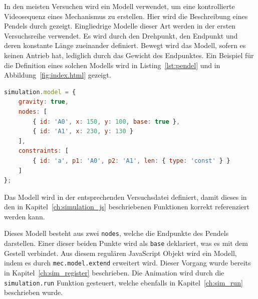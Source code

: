 In den meisten Versuchen wird ein  Modell verwendet, um eine kontrollierte Videosequenz eines Mechanismus zu erstellen.
Hier wird die Beschreibung eines Pendels durch  gezeigt.
Eingliedrige Modelle dieser Art werden in der ersten Versuchsreihe verwendet.
Es wird durch den Drehpunkt, den Endpunkt und deren konstante Länge zueinander definiert.
Bewegt wird das Modell, sofern es keinen Antrieb hat, lediglich durch das Gewicht des Endpunktes.
Ein Beispiel für die Definition eines solchen Modells wird in Listing~\ref{lst:pendel} und in Abbildung~\ref{fig:index.html} gezeigt.

\begin{lstlisting}[language=JavaScript, caption={Definition eines Pendels in \name{mec2} inklusive Animation.}, label={lst:pendel}]
simulation.model = {
    gravity: true,
    nodes: [
        { id: 'A0', x: 150, y: 100, base: true },
        { id: 'A1', x: 230, y: 130 }
    ],
    constraints: [
        { id: 'a', p1: 'A0', p2: 'A1', len: { type: 'const' } }
    ]
};
\end{lstlisting}

Das  Modell wird in der entsprechenden Versuchsdatei definiert, damit dieses in den in Kapitel~\ref{ch:simulation_js} beschriebenen Funktionen korrekt referenziert werden kann.

Dieses Modell besteht aus zwei \lstinline{nodes}, welche die Endpunkte des Pendels darstellen.
Einer dieser beiden Punkte wird als \lstinline{base} deklariert, was es mit dem Gestell verbindet.
Aus diesem regulären JavaScript Objekt wird ein  Modell, indem es durch \lstinline{mec.model.extend} erweitert wird.
Dieser Vorgang wurde bereits in Kapitel~\ref{ch:sim_register} beschrieben.
Die Animation wird durch die \lstinline{simulation.run} Funktion gesteuert, welche ebenfalls in Kapitel~\ref{ch:sim_run} beschrieben wurde.